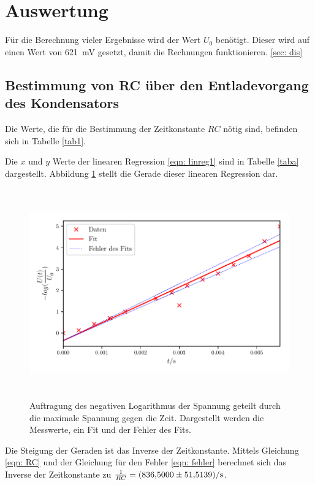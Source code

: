 \section{Auswertung}
\label{sec:Auswertung}

Für die Berechnung vieler Ergebnisse wird der Wert $U_0$ benötigt. Dieser wird auf einen Wert von \SI{621}{\milli\volt} gesetzt, damit die Rechnungen funktionieren. \ref{sec: dis}

\subsection{Bestimmung von RC über den Entladevorgang des Kondensators}
\label{sec: a}
Die Werte, die für die Bestimmung der Zeitkonstante $RC$ nötig sind, befinden sich in Tabelle \ref{tab1}. %

Die $x$ und $y$ Werte der linearen Regression \eqref{eqn: linreg1} sind in Tabelle \ref{taba} dargestellt.
Abbildung \ref{fig:plota} stellt die Gerade dieser linearen Regression dar.

\begin{figure}
  \centering
  \includegraphics[width=13cm, height=9cm]{build/plota.pdf}
  \caption{Auftragung des negativen Logarithmus der Spannung geteilt durch die maximale Spannung gegen die Zeit.
  Dargestellt werden die Messwerte, ein Fit und der Fehler des Fits.} %
  \label{fig:plota}
\end{figure}

\noindent Die Steigung der Geraden ist das Inverse der Zeitkonstante.
Mittels Gleichung \eqref{eqn: RC} und der Gleichung für den Fehler \eqref{eqn: fehler} berechnet
sich das Inverse der Zeitkonstante zu $\frac{1}{RC} = \SI{836.500 \pm 51.5139}{\per\second}$.

